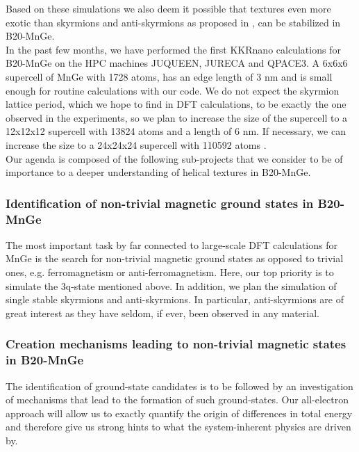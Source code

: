 \documentclass [a4paper, 12pt]{article}
\begin{document}
Based on these simulations we also deem it
possible that textures even more exotic than skyrmions and anti-skyrmions as proposed in 
\cite{rybakov_new_2015},
can be stabilized in B20-MnGe.
\\
In the past few months, we have performed the
first KKRnano calculations for B20-MnGe on the HPC machines JUQUEEN,
JURECA and QPACE3. A 6x6x6 supercell of MnGe with 1728 atoms, has an
edge length of 3 nm and is small enough for routine calculations with our code. We do not 
expect the skyrmion lattice period, which we hope to find in DFT calculations, to be exactly the 
one observed in the experiments, so we plan to increase the size of the supercell to a 12x12x12
supercell with 13824 atoms and a length of 6 nm. If necessary, we can increase the size
to a 24x24x24 supercell with 110592 atoms \cite{brommel_juqueen_2017}.
\\
Our agenda is composed of the following sub-projects that we consider to be of importance
to a deeper understanding of helical textures in
B20-MnGe.

\subsubsection{Identification of non-trivial magnetic ground states in B20-MnGe}
The most important task by far connected to large-scale DFT calculations for MnGe is the search for
non-trivial magnetic ground states as opposed to trivial ones,
e.g. ferromagnetism or anti-ferromagnetism.
Here, our top priority is to simulate the 3q-state mentioned above. In addition, we plan
the simulation of single stable
skyrmions and anti-skyrmions. In particular, anti-skyrmions are of great interest as they
have seldom, if ever, been observed in any material.
\subsubsection{Creation mechanisms leading to non-trivial magnetic states in B20-MnGe}
The identification of ground-state candidates is to be followed by an investigation of
mechanisms that lead to the formation of such ground-states. Our all-electron approach will allow 
us to exactly quantify the origin of differences in total energy and therefore give us strong hints
to what the system-inherent physics are driven by.
\end{document}
